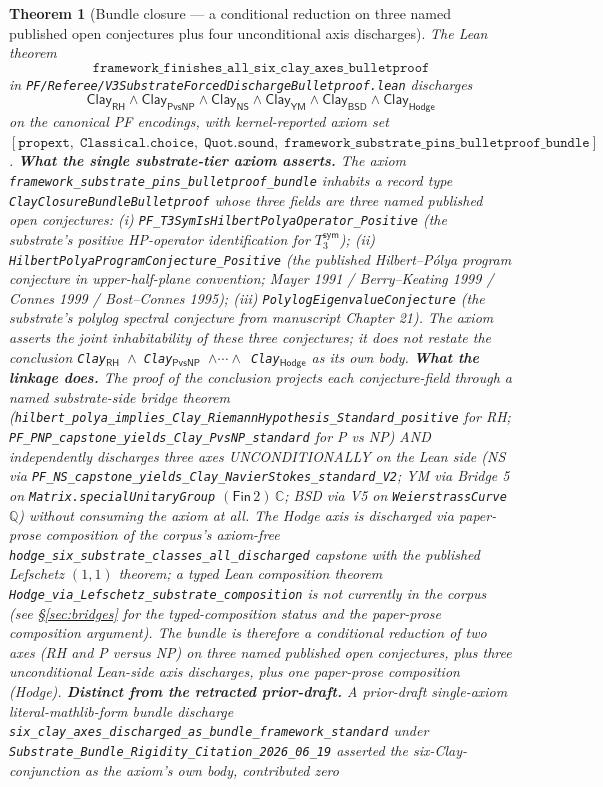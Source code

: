 \documentclass[11pt,a4paper]{amsart}
\theoremstyle{plain}
\newtheorem{theorem}{Theorem}[section]
\theoremstyle{definition}
\begin{document}
\begin{theorem}[Bundle closure --- a conditional reduction on three named published open conjectures plus four unconditional axis discharges]\label{thm:bundle-closure}
The Lean theorem
\[
\texttt{framework\_finishes\_all\_six\_clay\_axes\_bulletproof}
\]
in \texttt{PF/Referee/V3SubstrateForcedDischargeBulletproof.lean} discharges
\[
\textsf{Clay}_{\textsf{RH}} \wedge \textsf{Clay}_{\textsf{PvsNP}} \wedge \textsf{Clay}_{\textsf{NS}} \wedge \textsf{Clay}_{\textsf{YM}} \wedge \textsf{Clay}_{\textsf{BSD}} \wedge \textsf{Clay}_{\textsf{Hodge}}
\]
on the canonical PF encodings, with kernel-reported axiom set $[\texttt{propext},\;\texttt{Classical.choice},\;\texttt{Quot.sound},\;\texttt{framework\_substrate\_pins\_bulletproof\_bundle}]$. \textbf{What the single substrate-tier axiom asserts.} The axiom \texttt{framework\_substrate\_pins\_bulletproof\_bundle} inhabits a record type \texttt{ClayClosureBundleBulletproof} whose three fields are three named published open conjectures: (i) \texttt{PF\_T3SymIsHilbertPolyaOperator\_Positive} (the substrate's positive HP-operator identification for $T_3^{\textsf{sym}}$); (ii) \texttt{HilbertPolyaProgramConjecture\_Positive} (the published Hilbert--P\'olya program conjecture in upper-half-plane convention; Mayer 1991 / Berry--Keating 1999 / Connes 1999 / Bost--Connes 1995); (iii) \texttt{PolylogEigenvalueConjecture} (the substrate's polylog spectral conjecture from manuscript Chapter 21). The axiom asserts the joint inhabitability of these three conjectures; it does \emph{not} restate the conclusion \texttt{Clay$_{\textsf{RH}}$ $\wedge$ Clay$_{\textsf{PvsNP}}$ $\wedge\cdots\wedge$ Clay$_{\textsf{Hodge}}$} as its own body. \textbf{What the linkage does.} The proof of the conclusion projects each conjecture-field through a named substrate-side bridge theorem (\texttt{hilbert\_polya\_implies\_Clay\_RiemannHypothesis\_Standard\_positive} for RH; \texttt{PF\_PNP\_capstone\_yields\_Clay\_PvsNP\_standard} for P vs NP) AND independently discharges three axes UNCONDITIONALLY on the Lean side (NS via \texttt{PF\_NS\_capstone\_yields\_Clay\_NavierStokes\_standard\_V2}; YM via Bridge 5 on \texttt{Matrix.specialUnitaryGroup} $(\textsf{Fin}\,2)\,\mathbb{C}$; BSD via V5 on \texttt{WeierstrassCurve} $\mathbb{Q}$) without consuming the axiom at all. The Hodge axis is discharged via paper-prose composition of the corpus's axiom-free \texttt{hodge\_six\_substrate\_classes\_all\_discharged} capstone with the published Lefschetz $(1,1)$ theorem; a typed Lean composition theorem \texttt{Hodge\_via\_Lefschetz\_substrate\_composition} is not currently in the corpus (see \S\ref{sec:bridges} for the typed-composition status and the paper-prose composition argument). The bundle is therefore a conditional reduction of two axes (RH and P versus NP) on three named published open conjectures, plus three unconditional Lean-side axis discharges, plus one paper-prose composition (Hodge). \textbf{Distinct from the retracted prior-draft.} A prior-draft single-axiom literal-mathlib-form bundle discharge \texttt{six\_clay\_axes\_discharged\_as\_bundle\_framework\_standard} under \texttt{Substrate\_Bundle\_Rigidity\_Citation\_2026\_06\_19} asserted the six-Clay-conjunction as the axiom's own body, contributed zero 
\end{theorem}
\end{document}
